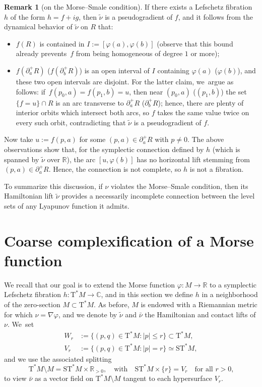\documentclass[10pt]{amsart}
\newcommand{\C}{{\mathbb C}}
\newcommand{\R}{{\mathbb R}}
\newcommand{\sT}{\mathrm{T}^\ast}
\newcommand{\sST}{\mathrm{ST}^\ast}
\newcommand{\hnu}{\tilde\nu}
\newcommand{\cnu}{\bar\nu}
\newcommand{\de}{\mathrel{:=}}
\newcommand{\with}{\mathrel{:}}
\let\del\partial
\let\on\colon
\theoremstyle{plain}
\theoremstyle{definition}
\newtheorem{remark}[theorem]{Remark}
\begin{document}
\begin{remark}[on the Morse--Smale condition]
If there exists a Lefschetz fibration $h$ of the form $h = f+ig$, then $\hnu$ is
a pseudogradient of $f$, and it follows from the dynamical behavior of $\hnu$
on $R$ that:
\begin{itemize}
\item
$f(R)$ is contained in $I \de [\varphi(a),\varphi(b)]$ (observe that this bound
already prevents~$f$ from being homogeneous of degree $1$ or more);
\item
$f(\del_a^+R)$ (\resp $f(\del_b^+R)$) is an open interval of $I$ containing
$\varphi(a)$ (\resp $\varphi(b)$), and these two open intervals are disjoint.
For the latter claim, we~argue as follows: if~$f(p_0,a) = f(p_1,b) = u$, then near $(p_0,a)$ (\resp $(p_1,b)$) the set $\{f=u\} \cap R$ is an arc transverse
to $\del_a^+R$ (\resp $\del_b^+R$); hence, there are plenty of interior orbits
which intersect both arcs, so $f$ takes the same value twice on every such
orbit, contradicting that $\hnu$ is a pseudogradient of $f$.
\end{itemize}
Now take $u \de f(p,a)$ for some $(p,a) \in \del_a^+R$ with $p \ne 0$. The above
observations show that, for the symplectic connection defined by $h$ (which is
spanned by $\hnu$ over $\R$), the arc $[u,\varphi(b)]$ has no horizontal lift
stemming from $(p,a) \in \del_a^+R$. Hence, the connection is not complete, so
$h$ is not a fibration.

To summarize this discussion, if $\nu$ violates the Morse--Smale condition, then
its Hamiltonian lift $\hnu$ provides a necessarily incomplete connection between
the level sets of any Lyapunov function it admits.
\end{remark}

\section{Coarse complexification of a Morse function} \label{s:coarse}

We recall that our goal is to extend the Morse function $\varphi \on M \to \R$
to a symplectic Lefschetz fibration $h \on \sT M \to \C$, and in this section we
define $h$ in a neighborhood of the zero-section $M \subset \sT M$. As before,
$M$ is endowed with a Riemannian metric for which $\nu = \nabla\varphi$, and we
denote by $\hnu$ and $\cnu$ the Hamiltonian and contact lifts of $\nu$. We~set
\begin{align*}
	W_r &\de \{(p,q) \in \sT M \with |p| \le r\} \subset \sT M, \\
	V_r &\de \{(p,q) \in \sT M \with |p| = r\} \simeq \sST M,
\end{align*}
and we use the associated splitting
\[
\sT M \setminus M = \sST M \times \R_{>0}, \quad \text{with} \quad
	\sST M \times \{r\} = V_r \quad \text{for all $r>0$,}
\]
to view $\cnu$ as a vector field on $\sT M \setminus M$ tangent to each hypersurface
$V_r$.
\end{document}
